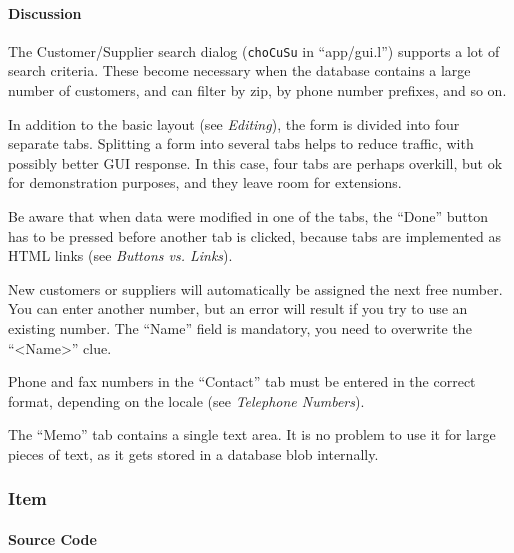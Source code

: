 \paragraph{Discussion}
\label{sec:appl-devel-customer/supplier-discussion}

The Customer/Supplier search dialog (\texttt{choCuSu} in ``app/gui.l'') supports
a lot of search criteria. These become necessary when the database
contains a large number of customers, and can filter by zip, by phone
number prefixes, and so on.

In addition to the basic layout (see \emph{Editing}), the form is
divided into four separate tabs. Splitting a form into several tabs
helps to reduce traffic, with possibly better GUI response. In this
case, four tabs are perhaps overkill, but ok for demonstration purposes,
and they leave room for extensions.

Be aware that when data were modified in one of the tabs, the ``Done''
button has to be pressed before another tab is clicked, because tabs are
implemented as HTML links (see \emph{Buttons vs. Links}).

New customers or suppliers will automatically be assigned the next free
number. You can enter another number, but an error will result if you
try to use an existing number. The ``Name'' field is mandatory, you need
to overwrite the ``<Name>'' clue.

Phone and fax numbers in the ``Contact'' tab must be entered in the
correct format, depending on the locale (see \emph{Telephone Numbers}).

The ``Memo'' tab contains a single text area. It is no problem to use it
for large pieces of text, as it gets stored in a database blob
internally.


\subsubsection{ Item}
\label{sec:appl-devel-item}%


\paragraph{Source Code}
\label{sec:appl-devel-item-source-code}


